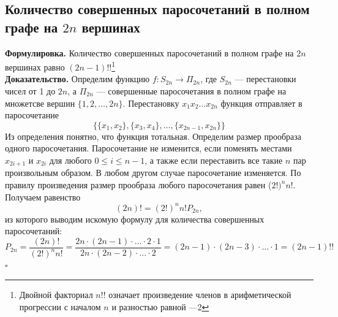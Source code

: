 \documentclass[a4paper]{article}
\newcommand{\qed}{\hfill$\square$}
\begin{document}
\subsection{Количество совершенных паросочетаний в полном графе на \texorpdfstring{$2n$}{2n} вершинах}
\textbf{Формулировка.} Количество совершенных паросочетаний в полном графе на $2n$ вершинах равно $(2n-1)!!$\footnote{Двойной факториал $n!!$ означает произведение членов в арифметической прогрессии с началом $n$ и разностью равной —2}\\[2mm]
\indent\textbf{Доказательство.} Определим функцию $f:S_{2n}\to\Pi_{2n}$, где $S_{2n}$ — перестановки чисел от 1 до $2n$, а $\Pi_{2n}$ — совершенные паросочетания в полном графе на множетсве вершин $\{1,2,\ldots,2n\}$. Перестановку $x_1x_2\ldots x_{2n}$ функция отправляет в паросочетание $$\{\{x_1,x_2\},\{x_3,x_4\},\ldots,\{x_{2n-1},x_{2n}\}\}$$
\indent Из определения понятно, что функция тотальная. Определим размер прообраза одного паросочетания. Паросочетание не изменится, если поменять местами $x_{2 i+1}$ и $x_{2 i}$ для любого $0 \leqslant i \leqslant n-1$, а также если переставить все такие $n$ пар произвольным образом. В любом другом случае паросочетание изменяется. По правилу произведения размер прообраза любого паросочетания равен ($2!)^nn!$. Получаем равенство $$(2n)!=(2!)^n n!P_{2 n},$$
из которого выводим искомую формулу для количества совершенных паросочетаний:
$$P_{2 n}=\frac{(2 n) !}{(2 !)^n n !}=\frac{2 n \cdot(2 n-1) \cdot \ldots \cdot 2 \cdot 1}{2 n \cdot(2 n-2) \cdot \ldots \cdot 2}=(2 n-1) \cdot(2 n-3) \cdot\ldots \cdot 1=(2 n-1) ! !$$\qed
\end{document}
